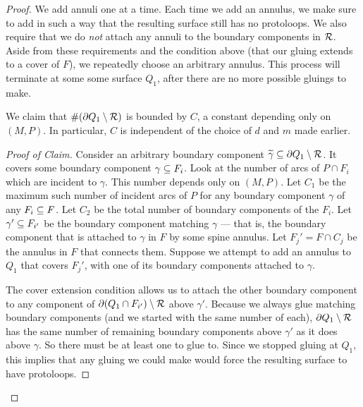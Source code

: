 \begin{proof}
We add annuli one at a time. Each time we add an annulus, we make sure to add
in such a way that the resulting surface still has no protoloops. We also
require that we do \emph{not} attach any annuli to the boundary components in
$\mathcal{R}$.  Aside from these requirements and the condition above (that our gluing
extends to a cover of $F$), we repeatedly choose an arbitrary annulus. This
process will terminate at some some surface $Q_1$, after there are no more
possible gluings to make.

\begin{claim}

We claim that $\#(\partial Q_1 \setminus \mathcal{R})$ is bounded by $C$, a constant
depending only on $(M,P)$. In particular, $C$ is independent of the choice of
$d$ and $m$ made earlier.

\end{claim}

\begin{proof}[Proof of Claim]

Consider an arbitrary boundary component $\widetilde{\gamma} \subseteq \partial Q_1
\setminus \mathcal{R}$.  It covers some boundary component $\gamma \subseteq F_i$. Look at
the number of arcs of $P \cap F_i$ which are incident to $\gamma$. This number
depends only on $(M,P)$. Let $C_1$ be the maximum such number of incident arcs
of $P$ for any boundary component $\gamma$ of any $F_i \subseteq F$. Let $C_2$ be
the total number of boundary components of the $F_i$. Let $\gamma' \subseteq F_{i'}$
be the boundary component matching $\gamma$ --- that is, the boundary component
that is attached to $\gamma$ in $F$ by some spine annulus. Let $F_j'= F \cap
C_j$ be the annulus in $F$ that connects them.  Suppose we attempt to add an
annulus to $Q_1$ that covers $F_j'$, with one of its boundary components
attached to $\gamma$.

The cover extension condition allows us to attach the other boundary component
to any component of $\partial(Q_1 \cap F_{i'}) \setminus \mathcal{R}$ above $\gamma'$.
Because we always glue matching boundary components (and we started with the
same number of each), $\partial Q_1 \setminus \mathcal{R}$ has the same number of remaining
boundary components above $\gamma'$ as it does above $\gamma$. So there must be
at least one to glue to.  Since we stopped gluing at $Q_1$, this implies that
any gluing we could make would force the resulting surface to have protoloops.


\end{proof}
\end{proof}

